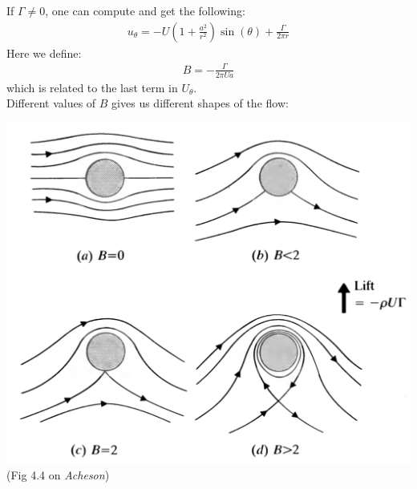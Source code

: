 \documentclass[11pt]{book}
\theoremstyle{break}
\theoremstyle{break}
\begin{document}
If $\Gamma \neq 0$, one can compute and get the following:
\begin{align*}
u_{\theta} = -U \left( 1+ \frac{a^2}{r^2}\right) \sin(\theta) + \frac{\Gamma}{2\pi r}
\end{align*}
Here we define:
\begin{align*}
B = -\frac{\Gamma}{2\pi Ua}
\end{align*}
which is related to the last term in $U_\theta$. \\
Different values of $B$ gives us different shapes of the flow:
\begin{center}
\includegraphics[scale=0.35]{B.png}\\
\color{gray}(Fig 4.4 on \textit{Acheson})\color{black}
\end{center}
\end{document}
